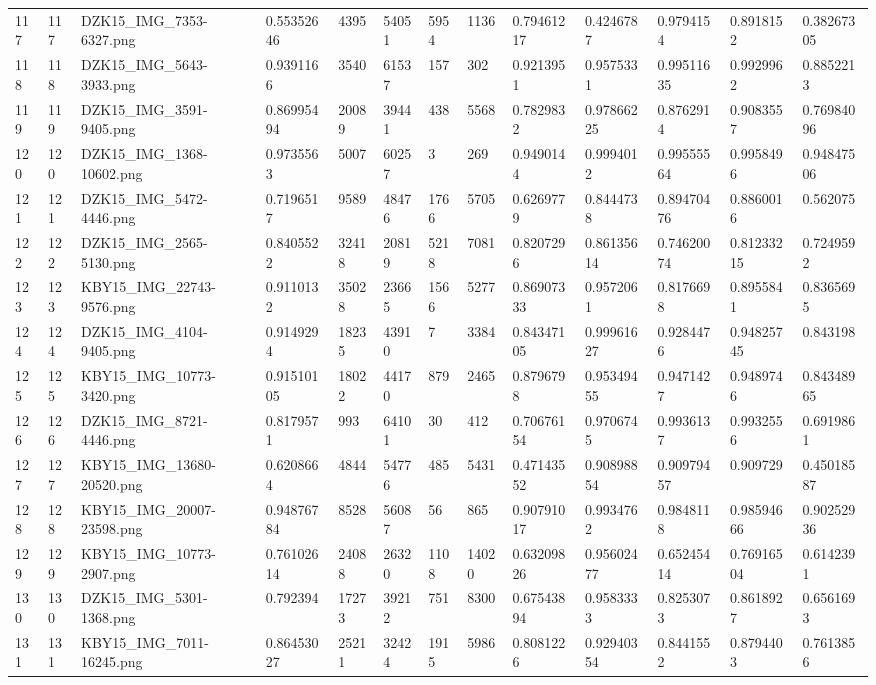 \documentclass[11pt, a4paper, twoside]{report}
\begin{document}
\begin{longtable}[c]{@{}lllllllllllll@{}}
117 & 117 & DZK15\_IMG\_7353-6327.png & 0.55352646 & 4395 & 54051 & 5954 & 1136 & 0.79461217 & 0.4246787 & 0.9794154 & 0.8918152 & 0.38267305 \\
118 & 118 & DZK15\_IMG\_5643-3933.png & 0.9391166 & 3540 & 61537 & 157 & 302 & 0.9213951 & 0.9575331 & 0.99511635 & 0.9929962 & 0.8852213 \\
119 & 119 & DZK15\_IMG\_3591-9405.png & 0.86995494 & 20089 & 39441 & 438 & 5568 & 0.7829832 & 0.97866225 & 0.8762914 & 0.9083557 & 0.76984096 \\
120 & 120 & DZK15\_IMG\_1368-10602.png & 0.9735563 & 5007 & 60257 & 3 & 269 & 0.9490144 & 0.9994012 & 0.99555564 & 0.9958496 & 0.94847506 \\
121 & 121 & DZK15\_IMG\_5472-4446.png & 0.7196517 & 9589 & 48476 & 1766 & 5705 & 0.6269779 & 0.8444738 & 0.89470476 & 0.8860016 & 0.562075 \\
122 & 122 & DZK15\_IMG\_2565-5130.png & 0.8405522 & 32418 & 20819 & 5218 & 7081 & 0.8207296 & 0.86135614 & 0.74620074 & 0.81233215 & 0.7249592 \\
123 & 123 & KBY15\_IMG\_22743-9576.png & 0.9110132 & 35028 & 23665 & 1566 & 5277 & 0.86907333 & 0.9572061 & 0.8176698 & 0.8955841 & 0.8365695 \\
124 & 124 & DZK15\_IMG\_4104-9405.png & 0.9149294 & 18235 & 43910 & 7 & 3384 & 0.84347105 & 0.99961627 & 0.9284476 & 0.94825745 & 0.843198 \\
125 & 125 & KBY15\_IMG\_10773-3420.png & 0.91510105 & 18022 & 44170 & 879 & 2465 & 0.8796798 & 0.95349455 & 0.9471427 & 0.9489746 & 0.84348965 \\
126 & 126 & DZK15\_IMG\_8721-4446.png & 0.8179571 & 993 & 64101 & 30 & 412 & 0.70676154 & 0.9706745 & 0.9936137 & 0.9932556 & 0.6919861 \\
127 & 127 & KBY15\_IMG\_13680-20520.png & 0.6208664 & 4844 & 54776 & 485 & 5431 & 0.47143552 & 0.90898854 & 0.90979457 & 0.909729 & 0.45018587 \\
128 & 128 & KBY15\_IMG\_20007-23598.png & 0.94876784 & 8528 & 56087 & 56 & 865 & 0.90791017 & 0.9934762 & 0.9848118 & 0.98594666 & 0.90252936 \\
129 & 129 & KBY15\_IMG\_10773-2907.png & 0.76102614 & 24088 & 26320 & 1108 & 14020 & 0.63209826 & 0.95602477 & 0.65245414 & 0.76916504 & 0.6142391 \\
130 & 130 & DZK15\_IMG\_5301-1368.png & 0.792394 & 17273 & 39212 & 751 & 8300 & 0.67543894 & 0.9583333 & 0.8253073 & 0.8618927 & 0.6561693 \\
131 & 131 & KBY15\_IMG\_7011-16245.png & 0.86453027 & 25211 & 32424 & 1915 & 5986 & 0.8081226 & 0.92940354 & 0.8441552 & 0.8794403 & 0.7613856 \\

\end{longtable}
\end{document}
